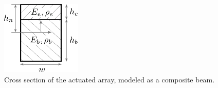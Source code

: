 \begin{figure}[t]
\centering
\includegraphics[height=1.4in]{../ch7/figures/BeamCrossSection2}
\caption{Cross section of the actuated array, modeled as a composite beam.} \label{fig:ch7:compositebeam}
\end{figure} 